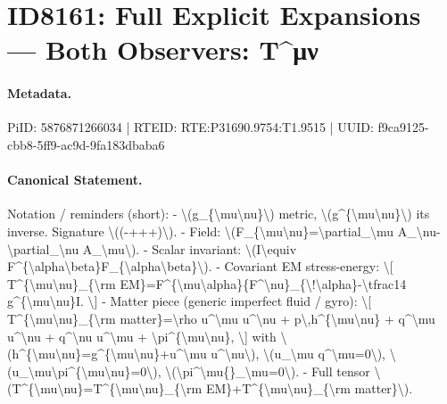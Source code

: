 \section*{ID8161: Full Explicit Expansions — Both Observers: T\textasciicircum{}μν}
\paragraph{Metadata.}
PiID: 5876871266034 | RTEID: RTE:P31690.9754:T1.9515 | UUID: f9ca9125-cbb8-5ff9-ac9d-9fa183dbaba6

\paragraph{Canonical Statement.}
Notation / reminders (short): - \textbackslash{}(g\_\{\textbackslash{}mu\textbackslash{}nu\}\textbackslash{}) metric, \textbackslash{}(g\textasciicircum{}\{\textbackslash{}mu\textbackslash{}nu\}\textbackslash{}) its inverse. Signature \textbackslash{}((-+++)\textbackslash{}). - Field: \textbackslash{}(F\_\{\textbackslash{}mu\textbackslash{}nu\}=\textbackslash{}partial\_\textbackslash{}mu A\_\textbackslash{}nu-\textbackslash{}partial\_\textbackslash{}nu A\_\textbackslash{}mu\textbackslash{}). - Scalar invariant: \textbackslash{}(I\textbackslash{}equiv F\textasciicircum{}\{\textbackslash{}alpha\textbackslash{}beta\}F\_\{\textbackslash{}alpha\textbackslash{}beta\}\textbackslash{}). - Covariant EM stress-energy: \textbackslash{}[ T\textasciicircum{}\{\textbackslash{}mu\textbackslash{}nu\}\_\{\textbackslash{}rm EM\}=F\textasciicircum{}\{\textbackslash{}mu\textbackslash{}alpha\}\{F\textasciicircum{}\textbackslash{}nu\}\_\{\textbackslash{}!\textbackslash{}alpha\}-\textbackslash{}tfrac14 g\textasciicircum{}\{\textbackslash{}mu\textbackslash{}nu\}I. \textbackslash{}] - Matter piece (generic imperfect fluid / gyro): \textbackslash{}[ T\textasciicircum{}\{\textbackslash{}mu\textbackslash{}nu\}\_\{\textbackslash{}rm matter\}=\textbackslash{}rho u\textasciicircum{}\textbackslash{}mu u\textasciicircum{}\textbackslash{}nu + p\textbackslash{},h\textasciicircum{}\{\textbackslash{}mu\textbackslash{}nu\} + q\textasciicircum{}\textbackslash{}mu u\textasciicircum{}\textbackslash{}nu + q\textasciicircum{}\textbackslash{}nu u\textasciicircum{}\textbackslash{}mu + \textbackslash{}pi\textasciicircum{}\{\textbackslash{}mu\textbackslash{}nu\}, \textbackslash{}] with \textbackslash{}(h\textasciicircum{}\{\textbackslash{}mu\textbackslash{}nu\}=g\textasciicircum{}\{\textbackslash{}mu\textbackslash{}nu\}+u\textasciicircum{}\textbackslash{}mu u\textasciicircum{}\textbackslash{}nu\textbackslash{}), \textbackslash{}(u\_\textbackslash{}mu q\textasciicircum{}\textbackslash{}mu=0\textbackslash{}), \textbackslash{}(u\_\textbackslash{}mu\textbackslash{}pi\textasciicircum{}\{\textbackslash{}mu\textbackslash{}nu\}=0\textbackslash{}), \textbackslash{}(\textbackslash{}pi\textasciicircum{}\textbackslash{}mu\{\}\_\textbackslash{}mu=0\textbackslash{}). - Full tensor \textbackslash{}(T\textasciicircum{}\{\textbackslash{}mu\textbackslash{}nu\}=T\textasciicircum{}\{\textbackslash{}mu\textbackslash{}nu\}\_\{\textbackslash{}rm EM\}+T\textasciicircum{}\{\textbackslash{}mu\textbackslash{}nu\}\_\{\textbackslash{}rm matter\}\textbackslash{}).

